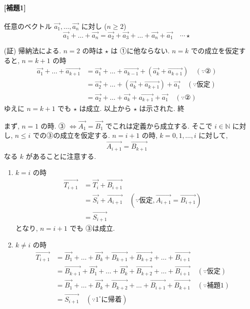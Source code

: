 \documentclass[../main.tex]{subfiles}
\begin{document}
\paragraph{[補題1]}
任意のベクトル $\vec{a_1}, \dots, \vec{a_n}$ に対し ($n \ge 2$)
\[
  \vec{a_1} + \dots + \vec{a_n} = \vec{a_2} + \vec{a_3} + \dots + \vec{a_n} + \vec{a_1} \quad \cdots \star
\]

(証) 帰納法による. $n=2$ の時は $\star$ は ①に他ならない. $n=k$ での成立を仮定すると, $n=k+1$ の時
\begin{align*}
  \vec{a_1} + \dots + \vec{a_{k+1}} &= \vec{a_1} + \dots + \vec{a_{k-1}} + (\vec{a_k} + \vec{a_{k+1}}) \quad (\because \text{②}) \\
  &= \vec{a_2} + \dots + (\vec{a_k} + \vec{a_{k+1}}) + \vec{a_1} \quad (\because \text{仮定}) \\
  &= \vec{a_2} + \dots + \vec{a_k} + \vec{a_{k+1}} + \vec{a_1} \quad (\because \text{②})
\end{align*}
ゆえに $n=k+1$ でも $\star$ は成立.
以上から $\star$ は示された. \hfill 終

\bigskip
まず, $n=1$ の時. ③ $\iff \vec{A_1} = \vec{B_1}$ でこれは定義から成立する. そこで $i \in \mathbb{N}$ に対し, $n \le i$ での③の成立を仮定する. $n=i+1$ の時, $k=0, 1, \dots, i$ に対して,
\[
  \vec{A_{i+1}} = \vec{B_{k+1}}
\]
なる $k$ があることに注意する.

\begin{enumerate}
  \item[$1^\circ$] $k=i$ の時
    \begin{align*}
      \vec{T_{i+1}} &= \vec{T_i} + \vec{B_{i+1}} \\
      &= \vec{S_i} + \vec{A_{i+1}} \quad (\because \text{仮定}, \vec{A_{i+1}} = \vec{B_{i+1}}) \\
      &= \vec{S_{i+1}}
    \end{align*}
    となり, $n=i+1$ でも ③は成立.

  \item[$2^\circ$] $k \ne i$ の時
    \begin{align*}
      \vec{T_{i+1}} &= \vec{B_1} + \dots + \vec{B_k} + \vec{B_{k+1}} + \vec{B_{k+2}} + \dots + \vec{B_{i+1}} \\
      &= \vec{B_{k+1}} + \vec{B_1} + \dots + \vec{B_k} + \vec{B_{k+2}} + \dots + \vec{B_{i+1}} \quad (\because \text{仮定}) \\
      &= \vec{B_1} + \dots + \vec{B_k} + \vec{B_{k+2}} + \dots + \vec{B_{i+1}} + \vec{B_{k+1}} \quad (\because \text{補題1}) \\
      &= \vec{S_{i+1}} \quad (\because 1^\circ \text{に帰着})
    \end{align*}
\end{enumerate}
\end{document}
